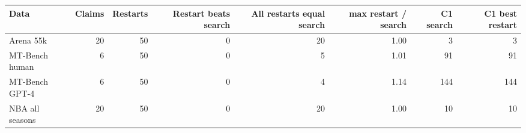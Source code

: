 \begin{tabular}{lrrrrrrr}
\toprule
Data & Claims & Restarts & Restart beats search & All restarts equal search & max restart / search & C1 search & C1 best restart \\
\midrule
Arena 55k & 20 & 50 & 0 & 20 & 1.00 & 3 & 3 \\
MT-Bench human & 6 & 50 & 0 & 5 & 1.01 & 91 & 91 \\
MT-Bench GPT-4 & 6 & 50 & 0 & 4 & 1.14 & 144 & 144 \\
NBA all seasons & 20 & 50 & 0 & 20 & 1.00 & 10 & 10 \\
\bottomrule
\end{tabular}
